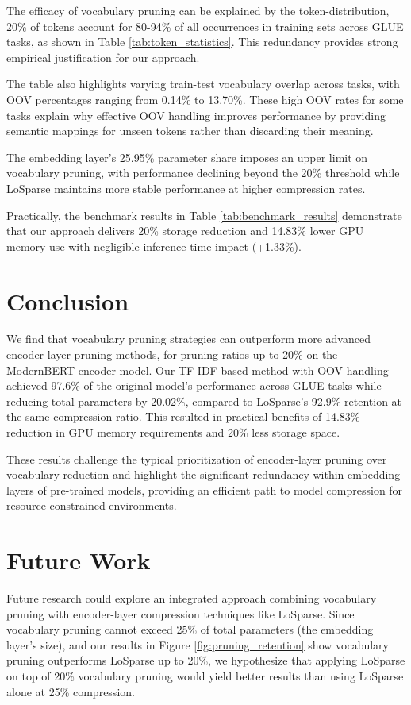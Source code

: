 \documentclass[twocolumn]{article}
\begin{document}
The efficacy of vocabulary pruning can be explained by the token-distribution, 20\% of tokens account for 80-94\% of all occurrences in training sets across GLUE tasks, as shown in Table \ref{tab:token_statistics}. This redundancy provides strong empirical justification for our approach. 

The table also highlights varying train-test vocabulary overlap across tasks, with OOV percentages ranging from 0.14\% to 13.70\%. These high OOV rates for some tasks explain why effective OOV handling improves performance by providing semantic mappings for unseen tokens rather than discarding their meaning.


The embedding layer's 25.95\% parameter share imposes an upper limit on vocabulary pruning, with performance declining beyond the 20\% threshold while LoSparse maintains more stable performance at higher compression rates. 

Practically, the benchmark results in Table \ref{tab:benchmark_results} demonstrate that our approach delivers 20\% storage reduction and 14.83\% lower GPU memory use with negligible inference time impact (+1.33\%).




\section{Conclusion}
We find that vocabulary pruning strategies can outperform more advanced encoder-layer pruning methods, for pruning ratios up to 20\% on the ModernBERT encoder model.
Our TF-IDF-based method with OOV handling achieved 97.6\% of the original model's performance across GLUE tasks while reducing total parameters by 20.02\%, compared to LoSparse's 92.9\% retention at the same compression ratio. This resulted in practical benefits of 14.83\% reduction in GPU memory requirements and 20\% less storage space.

These results challenge the typical prioritization of encoder-layer pruning over vocabulary reduction and highlight the significant redundancy within embedding layers of pre-trained models, providing an efficient path to model compression for resource-constrained environments.

\section{Future Work}
Future research could explore an integrated approach combining vocabulary pruning with encoder-layer compression techniques like LoSparse. Since vocabulary pruning cannot exceed 25\% of total parameters (the embedding layer's size), and our results in Figure \ref{fig:pruning_retention} show vocabulary pruning outperforms LoSparse up to 20\%, we hypothesize that applying LoSparse on top of 20\% vocabulary pruning would yield better results than using LoSparse alone at 25\% compression.




\end{document}
